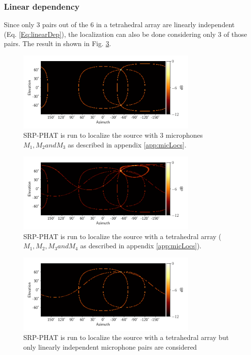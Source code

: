 \subsubsection{Linear dependency}
Since only 3 pairs out of the 6 in a tetrahedral array are linearly independent (Eq. \ref{Eq:linearDep}), the localization can also be done considering only 3 of those pairs. The result in shown in Fig. \ref{fig:4mic1srcInd}.
\begin{figure}[!ht]
    \centering
    \includegraphics[width=0.8\textwidth]{Figures/3mic1srcRes.png}
    \caption{SRP-PHAT is run to localize the source with 3 microphones $M_{1}, M_{2} and  M_{3}$ as described in appendix \ref{app:micLocs}.}
    \label{fig:3mic1src}
\end{figure}
\begin{figure}[!ht]
    \centering
    \includegraphics[width=0.8\textwidth]{Figures/4mic1srcRes.png}
    \caption{SRP-PHAT is run to localize the source with a tetrahedral array ($M_{1}, M_{2},  M_{3} and M_{4}$ as described in appendix \ref{app:micLocs}).}
    \label{fig:4mic1src}
\end{figure}
\begin{figure}[!ht]
    \centering
    \includegraphics[width=0.8\textwidth]{Figures/Ind4mic1srcRes.png}
    \caption{SRP-PHAT is run to localize the source with a tetrahedral array but only linearly independent microphone pairs are considered}
    \label{fig:4mic1srcInd}
\end{figure}

